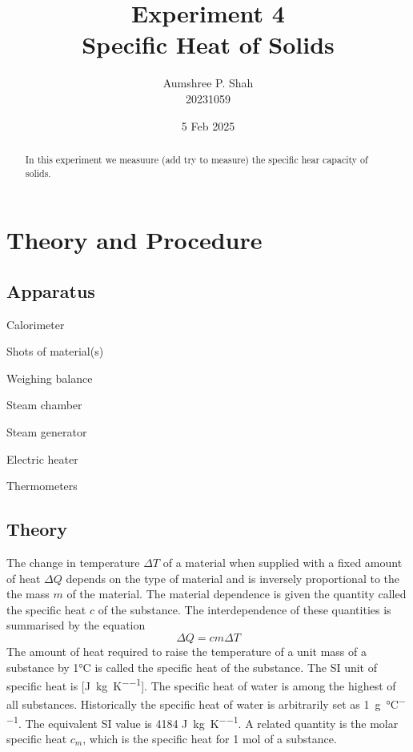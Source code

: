 \documentclass[%
 sor,
 jor,
 amsmath,amssymb,
 reprint,%
]{revtex4-2}
\begin{document}

\title{Experiment 4\\Specific Heat of Solids}

\author{Aumshree P. Shah\\20231059\color{red}}
\altaffiliation[\color{red}]{aumshree.pinkalbenshah@students.iiserpune.ac.in}
\date{5  Feb 2025}
\vspace{cm}
\begin{abstract}
In this experiment we measuure (add try to measure) the specific hear capacity of solids.
\end{abstract}
\maketitle
\section{Theory and Procedure}
\subsection{Apparatus}

{\small
\begin{itemize}
\begin{minipage}[t]{0.45\textwidth}
    \item Calorimeter
    \item Shots of material(s)
    \item Weighing balance
    \item Steam chamber
\end{minipage}
\hfill
\begin{minipage}[t]{0.45\textwidth}
    \item Steam generator
    \item Electric heater
    \item Thermometers
\end{minipage}
\end{itemize}
}

\subsection{Theory}

The change in temperature $\Delta T$ of a material when supplied with a fixed amount of heat $\Delta Q$ depends
on the type of material and is inversely proportional to the the mass $m$ of the material. The material dependence
is given the quantity called the specific heat $c$ of the substance. The interdependence of these quantities is
summarised by the equation$$\Delta Q= cm \Delta T$$
The amount of heat required to raise the temperature of a unit mass of a substance by 1\si{\celsius} is called the
specific heat of the substance. The SI unit of specific heat is [\si{\joule\per\kilogram\per\kelvin}]. The specific heat of water is among the highest of all substances. Historically the specific heat of water is arbitrarily set as 1\si{\calorie\per\gram\per\celsius}. The equivalent SI value is 4184 \si{\joule\per\kilogram\per\kelvin}. A related quantity is the molar specific heat $c_m$, which is the specific heat for 1  \si{\mole} of a substance. \\
\end{document}

